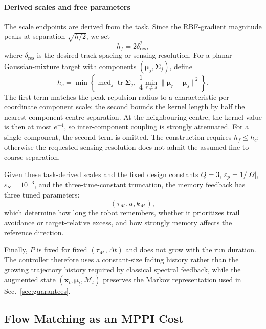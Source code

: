 \documentclass[conference]{IEEEtran}
\begin{document}
{\paragraph{Derived scales and free parameters}
The scale endpoints are derived from the task. Since the RBF-gradient magnitude
peaks at separation $\sqrt{h/2}$, we set
\begin{equation}\label{eq:fine_scale}
h_f=2\delta_{\mathrm{res}}^2,
\end{equation}
where $\delta_{\mathrm{res}}$ is the desired track spacing or sensing
resolution. For a planar Gaussian-mixture target with components
$(\boldsymbol\mu_j,\boldsymbol\Sigma_j)$, define
\begin{equation}\label{eq:coarse_scale}
h_c
=
\min\left\{
\operatorname{med}_j
\operatorname{tr}\boldsymbol\Sigma_j,
\;
\frac14
\min_{r\ne s}
\|\boldsymbol\mu_r-\boldsymbol\mu_s\|^2
\right\}.
\end{equation}
The first term matches the peak-repulsion radius to a characteristic
per-coordinate component scale; the second bounds the kernel length by half
the nearest component-centre separation. At the neighbouring centre, the
kernel value is then at most $e^{-4}$, so inter-component coupling is strongly
attenuated. For a single component, the second term is omitted. The
construction requires $h_f\le h_c$; otherwise the requested sensing resolution
does not admit the assumed fine-to-coarse separation.

Given these task-derived scales and the fixed design constants
$Q=3$, $\varepsilon_p=1/|\Omega|$, $\varepsilon_S=10^{-3}$, and the
three-time-constant truncation, the memory feedback has three tuned parameters:
\[
(\tau_{\mathcal M},a,k_{\mathcal M}),
\]
which determine how long the robot remembers, whether it prioritizes trail
avoidance or target-relative excess, and how strongly memory affects the
reference direction.

Finally, $P$ is fixed for fixed $(\tau_{\mathcal M},\Delta t)$ and does not grow
with the run duration. The controller therefore uses a constant-size fading
history rather than the growing trajectory history required by classical
spectral feedback, while the augmented state
$(\mathbf x_t,\boldsymbol\mu_t,\mathcal M_t)$ preserves the Markov
representation used in Sec.~\ref{sec:guarantees}.
}


\subsection{Flow Matching as an MPPI Cost}
\label{sec:fm_cost}
\end{document}
